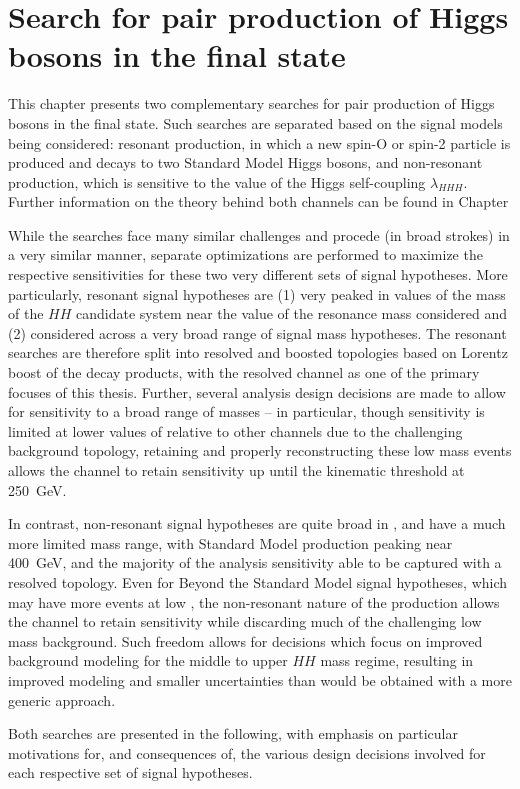 \chapter{Search for pair production of Higgs bosons in the \bbbb final state}

This chapter presents two complementary searches for pair production of 
Higgs bosons in the final state. Such searches are separated based on the 
signal models being considered: resonant production, in which a new spin-O or 
spin-2 particle is produced and decays to two Standard Model Higgs bosons, and 
non-resonant production, which is sensitive to the value of the Higgs self-coupling
$\lambda_{HHH}$. Further information on the theory behind both channels can be 
found in Chapter 

While the searches face many similar challenges and procede (in broad strokes) in a very 
similar manner, separate optimizations are performed to maximize the respective sensitivities 
for these two very different sets of signal hypotheses. More particularly, resonant signal 
hypotheses are (1) very peaked in values of the mass of the $HH$ candidate system near the 
value of the resonance mass considered and (2) considered across a very broad range of 
signal mass hypotheses. The resonant searches are therefore split into resolved and boosted 
topologies based on Lorentz boost of the decay products, with the resolved channel as one of the 
primary focuses of this thesis. Further, several analysis design decisions are made to 
allow for sensitivity to a broad range of masses -- in particular, though sensitivity is 
limited at lower values of \mhh relative to other channels  due to 
the challenging background topology, retaining and properly reconstructing these low mass events 
allows the \bbbb channel to retain sensitivity up until the kinematic threshold at \SI{250}{\GeV}.

In contrast, non-resonant signal hypotheses are quite broad in \mhh, and have a much more limited 
mass range, with Standard Model production peaking near \SI{400}{GeV}, and the majority of the analysis 
sensitivity able to be captured with a resolved topology. Even for Beyond the Standard 
Model signal hypotheses, which may have more events at low \mhh, the non-resonant nature of the
production allows the \bbbb channel to retain sensitivity while discarding much of the challenging 
low mass background. Such freedom allows for decisions which focus on improved background modeling 
for the middle to upper $HH$ mass regime, resulting in improved modeling and smaller uncertainties 
than would be obtained with a more generic approach.

Both searches are presented in the following, with emphasis on particular motivations for, and consequences
of, the various design decisions involved for each respective set of signal hypotheses. 